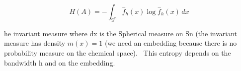 \[ H(A) = -\int_\mathbb{{S}^n}  \hat{f}_h(x)\log  \hat{f}_h(x) \,dx  \]



he invariant measure where dx is the Spherical measure on Sn (the invariant measure has density $m(x)=1$ (we need an embedding because there is no probability measure on the chemical space). 
This entropy depends on the bandwidth h and on the embedding.
